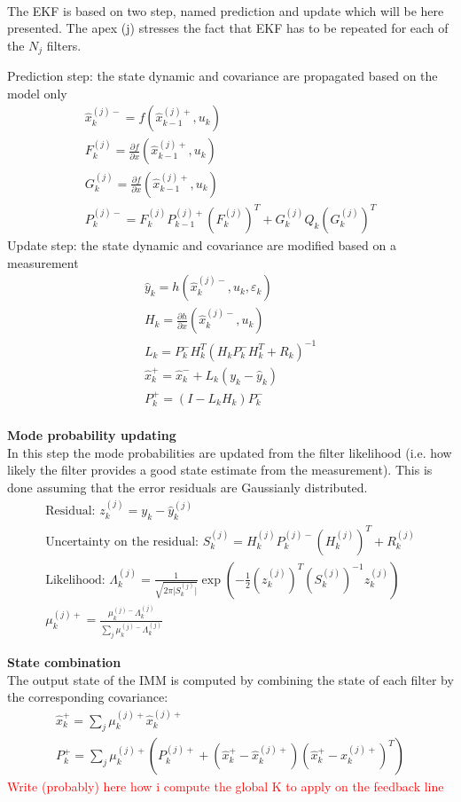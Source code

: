 \\
The EKF is based on two step, named prediction and update which will be here presented. The apex (j) stresses the fact that EKF has to be repeated for each of the $N_j$ filters. 

Prediction step: the state dynamic and covariance are propagated based on the model only 
\begin{gather}
  \hat{x}_k^{(j)-} = f(\hat{x}_{k-1}^{(j)+}, u_k)\\
  F_k^{(j)} = \frac{\partial f}{\partial x}(\hat{x}_{k-1}^{(j)+}, u_k)\\
  G_k^{(j)} = \frac{\partial f}{\partial x}(\hat{x}_{k-1}^{(j)+}, u_k)\\
  P_k^{(j)-} = F_k^{(j)} P_{k-1}^{(j)+} \left(F_k^{(j)}\right)^T + G_k^{(j)} Q_k \left(G_k^{(j)}\right)^T
\end{gather}
Update step: the state dynamic and covariance are modified based on a measurement 
\begin{gather}
  \hat{y}_k = h(\hat{x}_k^{(j)-}, u_k, \varepsilon_k)\\
  H_k = \frac{\partial h}{\partial x}(\hat{x}_k^{(j)-}, u_k)\\
  L_k = P_k^- H_k^T (H_k P_k^- H_k^T + R_k)^{-1}\\
  \hat{x}_k^+ = \hat{x}_k^- + L_k (y_k - \hat{y}_k)\\
  P_k^+ = (I - L_k H_k) P_k^-\\
\end{gather}

\textbf{Mode probability updating}\\
In this step the mode probabilities are updated from the filter likelihood (i.e. how likely the filter provides a good state estimate from the measurement). This is done assuming that the error residuals are Gaussianly distributed.  
\begin{gather}
  \text{Residual: } z_k^{(j)} = y_k - \hat{y}_k^{(j)}\\
  \text{Uncertainty on the residual: }S_k^{(j)} = H_k^{(j)} P_k^{(j)-} (H_k^{(j)})^T + R_k^{(j)}\\
  \text{Likelihood: } \Lambda_k^{(j)} = \frac{1}{\sqrt{2 \pi \lvert S_k^{(j)} \rvert}} \exp{\left(-\frac{1}{2}\left(z_k^{(j)}\right)^T \left(S_k^{(j)}\right)^{-1} z_k^{(j)}\right)}\\
  \mu_k^{(j)+} = \frac{\mu_k^{(j)-}\Lambda_k^{(j)}}{\sum_{j} \mu_k^{(j)-}\Lambda_k^{(j)}}
\end{gather}

\textbf{State combination}\\
The output state of the IMM is computed by combining the state of each filter by the corresponding covariance:
\begin{gather}
  \hat{x}_k^+ = \sum_j \mu_k^{(j)+} \hat{x}_k^{(j)+}\\
  P_k^+ = \sum_j \mu_k^{(j)+} \left(P_k^{(j)+} + \left(\hat{x}_k^+ - \hat{x}_k^{(j)+}\right)\left(\hat{x}_k^+ - \hat{x}_k^{(j)+}\right)^T\right)
\end{gather}
\textcolor{red}{Write (probably) here how i compute the global K to apply on the feedback line}

